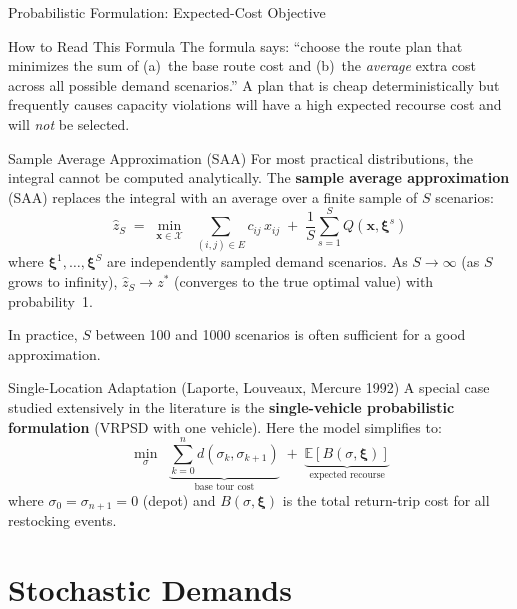\documentclass[aspectratio=169,10pt]{beamer}
\begin{document}
\begin{frame}[allowframebreaks]{Probabilistic Formulation: Expected-Cost Objective}
  \begin{alertblock}{How to Read This Formula}
    The formula says: ``choose the route plan that minimizes the sum of
    (a)~the base route cost and (b)~the \emph{average} extra cost across
    all possible demand scenarios.''
    A plan that is cheap deterministically but frequently causes capacity
    violations will have a high expected recourse cost and will \emph{not}
    be selected.
  \end{alertblock}

  \framebreak

  \begin{block}{Sample Average Approximation (SAA)}
    For most practical distributions, the integral cannot be computed
    analytically.
    The \textbf{sample average approximation} (SAA) replaces the integral
    with an average over a finite sample of $S$ scenarios:
    \[
      \hat{z}_S \;=\; \min_{\mathbf{x} \in \mathcal{X}} \;\;
        \sum_{(i,j)\in E} c_{ij}\, x_{ij}
        \;+\; \frac{1}{S} \sum_{s=1}^{S} Q(\mathbf{x}, \boldsymbol{\xi}^s)
    \]
    where $\boldsymbol{\xi}^1, \ldots, \boldsymbol{\xi}^S$ are
    independently sampled demand scenarios.
    As $S \to \infty$ (as $S$ grows to infinity), $\hat{z}_S \to z^*$
    (converges to the true optimal value) with probability~1.

    In practice, $S$ between 100 and 1000 scenarios is often sufficient
    for a good approximation.
  \end{block}

  \begin{block}{Single-Location Adaptation (Laporte, Louveaux, Mercure 1992)}
    A special case studied extensively in the literature is the
    \textbf{single-vehicle probabilistic formulation} (VRPSD with one vehicle).
    Here the model simplifies to:
    \[
      \min_\sigma \;\;
      \underbrace{\sum_{k=0}^{n} d(\sigma_k, \sigma_{k+1})}_{\text{base tour cost}}
      \;+\; \underbrace{\mathbb{E}[B(\sigma, \boldsymbol{\xi})]}_{\text{expected recourse}}
    \]
    where $\sigma_0 = \sigma_{n+1} = 0$ (depot) and $B(\sigma,\boldsymbol{\xi})$
    is the total return-trip cost for all restocking events.
  \end{block}

\end{frame}

\section{Stochastic Demands}
\end{document}
